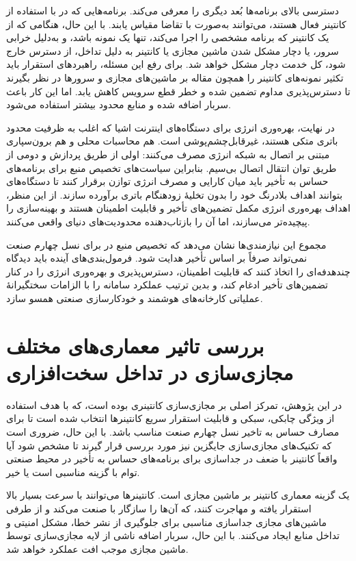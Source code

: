 دسترسی بالای برنامه‌ها بُعد دیگری را معرفی می‌کند. برنامه‌هایی که در  با استفاده از کانتینر فعال هستند، می‌توانند به‌صورت با تقاضا مقیاس یابند. با این حال، هنگامی که از یک کانتینر که برنامه مشخصی را اجرا می‌کند، تنها یک نمونه باشد، و به‌دلیل خرابی سرور، یا دچار مشکل شدن ماشین مجازی یا کانتینر به دلیل تداخل، از دسترس خارج شود، کل خدمت دچار مشکل خواهد شد. برای رفع این مسئله، راهبردهای استقرار باید تکثیر نمونه‌های کانتینر را همچون مقاله \cite{Zhang2020Neighbors} بر ماشین‌های مجازی و سرور‌ها در نظر بگیرند تا دسترس‌پذیری مداوم تضمین شده و خطر قطع سرویس کاهش یابد. اما این کار باعث سربار اضافه شده و منابع محدود  بیشتر استفاده می‌شود.

در نهایت، بهره‌وری انرژی برای دستگاه‌های اینترنت اشیا که اغلب به ظرفیت محدود باتری متکی هستند، غیرقابل‌چشم‌پوشی است. هم محاسبات محلی و هم برون‌سپاری مبتنی بر اتصال به شبکه انرژی مصرف می‌کنند\cite{Kaur2020KEIDS}: اولی از طریق پردازش و دومی از طریق توان انتقال اتصال بی‌سیم. بنابراین سیاست‌های تخصیص منبع برای برنامه‌های حساس به تأخیر باید میان کارایی و مصرف انرژی توازن برقرار کنند تا دستگاه‌های  بتوانند اهداف بلادرنگ خود را بدون تخلیهٔ زودهنگام باتری برآورده سازند. از این منظر، اهداف بهره‌وری انرژی مکمل تضمین‌های تأخیر و قابلیت اطمینان هستند و بهینه‌سازی را پیچیده‌تر می‌سازند، اما آن را بازتاب‌دهنده محدودیت‌های دنیای واقعی می‌کنند.

مجموع این نیازمندی‌ها نشان می‌دهد که تخصیص منبع در  برای نسل چهارم صنعت نمی‌تواند صرفاً بر اساس تأخیر هدایت شود. فرمول‌بندی‌های آینده باید دیدگاه چندهدفه‌ای را اتخاذ کنند که قابلیت اطمینان، دسترس‌پذیری و بهره‌وری انرژی را در کنار تضمین‌های تأخیر ادغام کند، و بدین ترتیب عملکرد سامانه را با الزامات سختگیرانهٔ عملیاتی کارخانه‌های هوشمند و خودکارسازی صنعتی همسو سازد.

\section{بررسی تاثیر معماری‌های مختلف مجازی‌سازی در تداخل سخت‌افزاری}

در این پژوهش، تمرکز اصلی بر مجازی‌سازی کانتینری بوده است، که با هدف استفاده از ویژگی چابکی، سبکی و قابلیت استقرار سریع کانتینرها انتخاب شده است تا برای مصارف حساس به تاخیر نسل چهارم صنعت مناسب باشد. با این حال، ضروری است که تکنیک‌های مجازی‌سازی جایگزین نیز مورد بررسی قرار گیرند تا مشخص شود آیا واقعاً کانتینر با ضعف در جداسازی برای برنامه‌های حساس به تأخیر در محیط‌ صنعتی توام با  گزینه مناسبی است یا خیر.

یک گزینه‌ معماری کانتینر بر ماشین مجازی است. کانتینرها می‌توانند با سرعت بسیار بالا استقرار یافته و مهاجرت کنند، که آن‌ها را سازگار با صنعت می‌کند و از طرفی ماشین‌های مجازی جداسازی مناسبی برای جلوگیری از نشر خطا، مشکل امنیتی و تداخل منابع ایجاد می‌کنند. با این حال، سربار اضافه ناشی از لایه مجازی‌سازی توسط ماشین مجازی موجب افت عملکرد خواهد شد.

